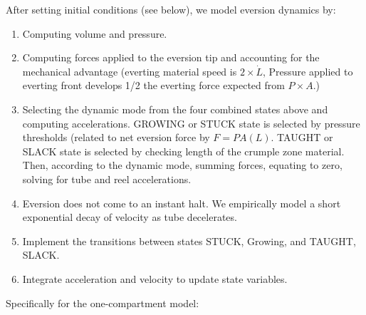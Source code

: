 \documentclass[letterpaper]{article}
\begin{document}
After setting initial conditions (see below), we model eversion dynamics by:
\begin{enumerate}
  \item Computing volume and pressure.
  \item Computing forces applied to the eversion tip and accounting for the mechanical advantage (everting material speed is $2\times\dot{L}$, Pressure applied to everting front develops 1/2 the everting force expected from $P\times A$.)

  \item Selecting the dynamic mode from the four combined states above and computing accelerations.
  GROWING or STUCK state is selected by pressure thresholds (related to net
  eversion force by $F=PA(L)$.
  TAUGHT or SLACK state is selected by checking length of
  the crumple zone material. Then, according to the dynamic mode, summing forces, equating to  zero, solving for tube and reel accelerations.

  \item Eversion does not come to an instant halt. We  empirically model a short exponential decay of velocity as tube decelerates.

  \item Implement the transitions between states STUCK, Growing, and TAUGHT,  SLACK. %


  \item  Integrate acceleration and velocity to update state variables.  %


\end{enumerate}

\noindent
Specifically for the one-compartment model:
\end{document}
